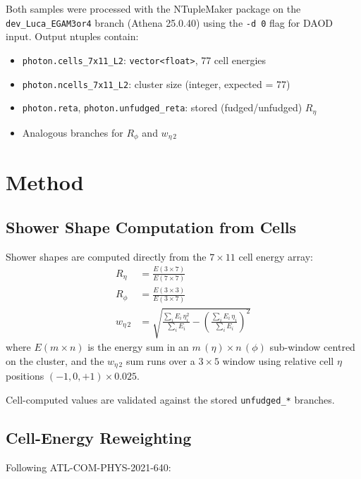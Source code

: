 \documentclass[a4paper,11pt]{article}
\begin{document}
Both samples were processed with the NTupleMaker package on the
\texttt{dev\_Luca\_EGAM3or4} branch (Athena 25.0.40) using the
\texttt{-d~0} flag for DAOD input. Output ntuples contain:
\begin{itemize}
  \item \texttt{photon.cells\_7x11\_L2}: \texttt{vector<float>}, 77 cell energies
  \item \texttt{photon.ncells\_7x11\_L2}: cluster size (integer, expected = 77)
  \item \texttt{photon.reta}, \texttt{photon.unfudged\_reta}: stored (fudged/unfudged) $R_\eta$
  \item Analogous branches for $R_\phi$ and $w_{\eta\,2}$
\end{itemize}

\section{Method}

\subsection{Shower Shape Computation from Cells}

Shower shapes are computed directly from the $7\times11$ cell energy array:
\begin{align}
  R_\eta &= \frac{E(3\times7)}{E(7\times7)} \\
  R_\phi &= \frac{E(3\times3)}{E(3\times7)} \\
  w_{\eta\,2} &= \sqrt{\frac{\sum_i E_i \,\eta_i^2}{\sum_i E_i}
                 - \left(\frac{\sum_i E_i \,\eta_i}{\sum_i E_i}\right)^2}
\end{align}
where $E(m\times n)$ is the energy sum in an $m\,(\eta) \times n\,(\phi)$
sub-window centred on the cluster, and the $w_{\eta\,2}$ sum runs over a
$3\times5$ window using relative cell $\eta$ positions
$(-1, 0, +1) \times 0.025$.

Cell-computed values are validated against the stored \texttt{unfudged\_*}
branches.

\subsection{Cell-Energy Reweighting}

Following ATL-COM-PHYS-2021-640:
\end{document}
